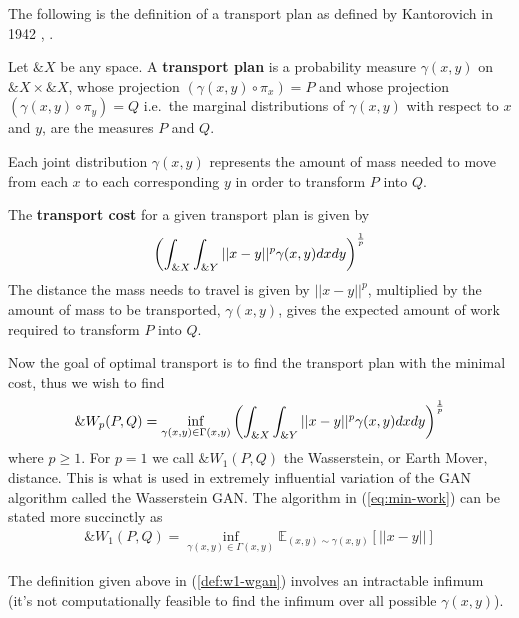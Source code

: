 The following is the definition of a transport plan as defined by
Kantorovich in 1942 \cite{ref:kantorovich-1942},
\cite{ref:vershik-2013}.

\begin{definition}
  Let $\&X$ be any space. A \textbf{transport plan} is a probability
  measure $\gamma(x, y)$ on $\&X \times \&X$, whose projection
  $(\gamma(x, y) \circ \pi_{x}) = P$ and whose projection
  $(\gamma(x, y) \circ \pi_{y}) = Q$ i.e.\ the marginal distributions
  of $\gamma(x, y)$ with respect to $x$ and $y$, are the measures $P$
  and $Q$.
\end{definition}

\begin{remark}
  Each joint distribution $\gamma(x, y)$ represents the amount of mass
  needed to move from each $x$ to each corresponding $y$ in order to
  transform $P$ into $Q$.
\end{remark}

\begin{definition} The \textbf{transport cost} for a given transport
  plan is given by
  \begin{align}
    \label{eq:expected-work}
    \left(\int_{\&X}\int_{\&Y}||x-y||^p\gamma(x, y)dxdy \right)^{1 \over p}
  \end{align}
  The distance the mass needs to travel is given by $||x-y||^p$,
  multiplied by the amount of mass to be transported, $\gamma(x, y)$,
  gives the expected amount of work required to transform $P$ into
  $Q$.
\end{definition}

Now the goal of optimal transport is to find the transport plan with
the minimal cost, thus we wish to find
\begin{align}
  \label{eq:min-work}
  \&W_p(P, Q) = \inf_{\gamma(x,y) \in \Gamma(x,y)} \left( \int_{\&X}\int_{\&Y}||x-y||^p\gamma(x, y)dxdy \right)^{1 \over p}
\end{align}
where $p \geq 1$. For $p=1$ we call $\&W_1(P, Q)$ the Wasserstein, or
Earth Mover, distance. This is what is used in extremely influential
variation of the GAN algorithm called the Wasserstein GAN. The
algorithm in (\ref{eq:min-work}) can be stated more succinctly as
\begin{align}
  \label{def:w1-wgan}
  \&W_1(P, Q) = \inf_{\gamma(x, y) \in \Gamma(x,y)}\mathbb{E}_{(x,y) \sim \gamma(x, y)} \left[ || x-y || \right]
\end{align}
\begin{remark}
  The definition given above in (\ref{def:w1-wgan}) involves an
  intractable infimum (it's not computationally feasible to find the
  infimum over all possible $\gamma(x, y)$).
\end{remark}

